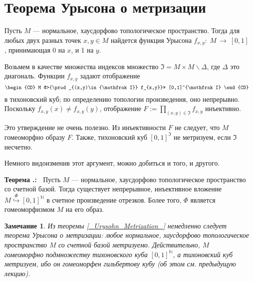 \documentclass[12pt]{book}
\newcommand{\arrow}{{\:\longrightarrow\:}}
\def\N{{\mathbb N}}
\theoremstyle{upshape}
\newtheorem{zadacha}{Задача}[chapter]
\theoremstyle{generic}
\newtheorem{remark}[teorema]{Замечание}
\def\замечание{\begin{remark}}
\def\еза{\end{remark}}
\theoremstyle{upshapenonumber}
\newcommand{\следствие}{%
     \refstepcounter{teorema}
     {\noindent\bf Следствие \thechapter.\arabic{teorema}:\ }}
\newcommand{\пример}{%
     \refstepcounter{teorema}
     {\noindent\bf Пример \thechapter.\arabic{teorema}:\ }}
\newcommand{\лемма}{%
     \refstepcounter{teorema}
     {\noindent\bf Лемма \thechapter.\arabic{teorema}:\ }}
\newcommand{\теорема}{%
     \refstepcounter{teorema}
     {\noindent\bf Теорема \thechapter.\arabic{teorema}:\ }}
\newcommand{\утверждение}{%
     \refstepcounter{teorema}
     {\noindent\bf Утверждение \thechapter.\arabic{teorema}:\ }}
\def\хфилл{\hfill}
\def\ем{\em}
\def\задача{\begin{zadacha}}
\def\ез{\end{zadacha}}
\def\еу{\end{ukazanie}}
\def\ео{\end{opredelenie}}
\def\goth{\mathfrak}
\def\енум{\begin{enumerate}}
\def\ее{\end{enumerate}}
\begin{document}

\section{Теорема Урысона о метризации}


Пусть $M$ --- нормальное, хаусдорфово топологическое пространство.
Тогда для любых двух разных точек $x, y \in M$ найдется
функция Урысона $f_{x,y}:\; M \arrow [0,1]$, принимающая 
0 на $x$, и 1 на $y$.

Возьмем в качестве множества индексов 
множество ${\goth I} = M \times M \backslash \Delta$,
где $\Delta$ это диагональ. Функции $f_{x,y}$
задают отображение
\begin{equation} \label{_embe_via_Ury_Equation_}
\begin{CD}
M @>{\prod_{(x,y)\in {\goth I}} f_{x,y}}>>  [0,1]^{\goth I}
\end{CD}
\end{equation}
в тихоновский куб; по определению топологии произведения,
оно непрерывно. Поскольку $f_{x,y}(x) \neq f_{x,y}(y)$,
отображение $F:= \prod_{(x,y)\in {\goth I}} f_{x,y}$
инъективно.

Это утверждение не очень полезно.
Из инъективности $F$ не следует, что $M$
гомеоморфно образу $F$. Также, тихоновский куб
$[0,1]^{\goth I}$ не метризуем, если
${\goth I}$ несчетно.

Немного видоизменив этот аргумент, можно добиться
и того, и другого.


\хфилл

\теорема\label{_Urysohn_Metrization_}
Пусть $M$ --- нормальное, хаусдорфово топологическое
пространство со счетной базой. Тогда существует
непрерывное, инъективное вложение 
$M \stackrel \Phi \hookrightarrow [0,1]^{\N}$ в
счетное произведение отрезков.
Более того, $\Phi$ является гомеоморфизмом $M$
на его образ.

\hfill

\замечание
Из теоремы \ref{_Urysohn_Metrization_}
немедленно следует теорема Урысона о метризации:
любое нормальное, хаусдорфово топологическое
пространство $M$ со счетной базой метризуемо.
Действительно, $M$ гомеоморфно подмножеству
тихоновского куба $[0,1]^{\N}$, а тихоновский куб
метризуем, ибо он гомеоморфен гильбертову
кубу (об этом см. предыдущую лекцию).
\еза

\хфилл
\end{document}
